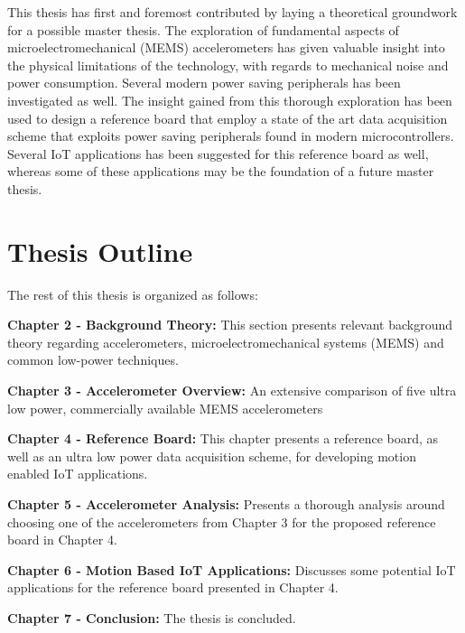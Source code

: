 This thesis has first and foremost contributed by laying a theoretical groundwork for a possible master thesis. The exploration of fundamental aspects of microelectromechanical (MEMS) accelerometers has given valuable insight into the physical limitations of the technology, with regards to mechanical noise and power consumption. Several modern power saving peripherals has been investigated as well. The insight gained from this thorough exploration has been used to design a reference board that employ a state of the art data acquisition scheme that exploits power saving peripherals found in modern microcontrollers. Several IoT applications has been suggested for this reference board as well, whereas some of these applications may be the foundation of a future master thesis.

\newpage

\section{Thesis Outline}

The rest of this thesis is organized as follows:

\textbf{Chapter 2 - Background Theory:} This section presents relevant background theory regarding accelerometers, microelectromechanical systems (MEMS) and common low-power techniques.  

\textbf{Chapter 3 - Accelerometer Overview:} An extensive comparison of five ultra low power, commercially available MEMS accelerometers

\textbf{Chapter 4 - Reference Board:} This chapter presents a reference board, as well as an ultra low power data acquisition scheme, for developing motion enabled IoT applications.

\textbf{Chapter 5 - Accelerometer Analysis:} Presents a thorough analysis around choosing one of the accelerometers from Chapter 3 for the proposed reference board in Chapter 4.

\textbf{Chapter 6 - Motion Based IoT Applications:} Discusses some potential IoT applications for the reference board presented in Chapter 4.

\textbf{Chapter 7 - Conclusion:} The thesis is concluded.


